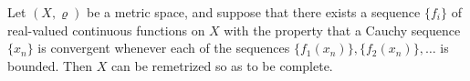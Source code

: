 Let $(X, \varrho)$ be a metric space, and suppose that there exists a sequence $\{f_i\}$ of real-valued continuous functions on $X$ with the property that a Cauchy sequence $\{x_n\}$ is convergent whenever each of the sequences $\{f_1(x_n)\}, \{f_2(x_n)\}, \ldots$ is bounded. Then $X$ can be remetrized so as to be complete.
